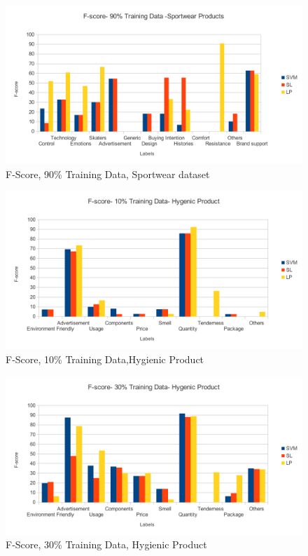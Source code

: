 \documentclass[4pt,a4paper,twocolumn]{article}
\begin{document}
\begin{figure}[]
  
  \centering
    \includegraphics[scale=0.7]{graphics/sportWear/fscore-90-nike}
    \caption{F-Score, 90\% Training Data, Sportwear dataset}
   \label{fig:nike_90_fscore}  
\end{figure}


\begin{figure}[]
  
  \centering
    \includegraphics[scale=0.7]{graphics/terra/fscore-terra-10}
    \caption{F-Score, 10\% Training Data,Hygienic Product}
   \label{fig:terra_10_fscore}  
\end{figure}


\begin{figure}[]
  
  \centering
    \includegraphics[scale=0.7]{graphics/terra/fscore-terra-30}
    \caption{F-Score, 30\% Training Data, Hygienic Product}
   \label{fig:terra_30_fscore}  
\end{figure}
\end{document}
